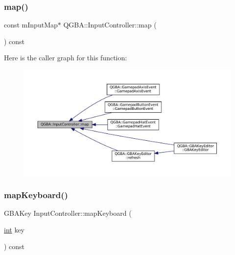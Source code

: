 \subsubsection{\texorpdfstring{map()}{map()}}
{\footnotesize\ttfamily const m\+Input\+Map$\ast$ Q\+G\+B\+A\+::\+Input\+Controller\+::map (\begin{DoxyParamCaption}{ }\end{DoxyParamCaption}) const\hspace{0.3cm}{\ttfamily [inline]}}

Here is the caller graph for this function\+:
\nopagebreak
\begin{figure}[H]
\begin{center}
\leavevmode
\includegraphics[width=350pt]{class_q_g_b_a_1_1_input_controller_a7b4aaedf3b76edb0490967bfbff6f32e_icgraph}
\end{center}
\end{figure}
\mbox{\label{class_q_g_b_a_1_1_input_controller_a0b30490d7d98cf90002e1d7d4a9dde01}} 
\subsubsection{\texorpdfstring{map\+Keyboard()}{mapKeyboard()}}
{\footnotesize\ttfamily G\+B\+A\+Key Input\+Controller\+::map\+Keyboard (\begin{DoxyParamCaption}\item[{\mbox{\hyperlink{ioapi_8h_a787fa3cf048117ba7123753c1e74fcd6}{int}}}]{key }\end{DoxyParamCaption}) const}

